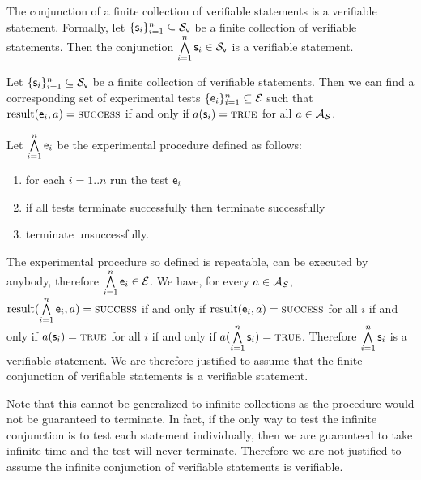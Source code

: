 \documentclass[11pt,letterpaper,fleqn]{memoir} %
\begin{document}
\begin{mathSection}
	\begin{axiom}\label{ax_verifiable_AND}
	The conjunction of a finite collection of verifiable statements is a verifiable statement. Formally, let $\{\mathsf{s}_i\}_{i=1}^{n} \subseteq \mathcal{S}_\textsf{v}$ be a finite collection of verifiable statements. Then the conjunction $\bigwedge\limits_{i=1}^{n} \mathsf{s}_i \in \mathcal{S}_\textsf{v}$ is a verifiable statement.
	\end{axiom}
	\begin{justification}
		Let $\{\mathsf{s}_i\}_{i=1}^{n} \subseteq \mathcal{S}_\textsf{v}$ be a finite collection of verifiable statements. Then we can find a corresponding set of experimental tests $\{\mathsf{e}_i\}_{i=1}^{n} \subseteq \mathcal{E}$ such that $\operatorname{result}(\mathsf{e}_i, a) = \textsc{success}$ if and only if $a(\mathsf{s}_i) = \textsc{true}$ for all $a \in \mathcal{A}_{\mathcal{S}}$.
		
		Let $\bigwedge\limits_{i=1}^{n} \mathsf{e}_i$ be the experimental procedure defined as follows:
		\begin{enumerate}
			\item for each $i=1..n$ run the test $\mathsf{e}_i$
			\item if all tests terminate successfully then terminate successfully
			\item terminate unsuccessfully.
		\end{enumerate}
		The experimental procedure so defined is repeatable, can be executed by anybody, therefore $\bigwedge\limits_{i=1}^{n} \mathsf{e}_i \in \mathcal{E}$. We have, for every $a \in \mathcal{A}_{\mathcal{S}}$, $\operatorname{result}(\bigwedge\limits_{i=1}^{n} \mathsf{e}_i, a) = \textsc{success}$ if and only if $\operatorname{result}(\mathsf{e}_i, a) = \textsc{success}$ for all $i$ if and only if $a(\mathsf{s}_i) = \textsc{true}$ for all $i$ if and only if $a(\bigwedge\limits_{i=1}^{n}\mathsf{s}_i) = \textsc{true}$. Therefore $\bigwedge\limits_{i=1}^{n}\mathsf{s}_i$ is a verifiable statement. We are therefore justified to assume that the finite conjunction of verifiable statements is a verifiable statement.
		
		Note that this cannot be generalized to infinite collections as the procedure would not be guaranteed to terminate. In fact, if the only way to test the infinite conjunction is to test each statement individually, then we are guaranteed to take infinite time and the test will never terminate. Therefore we are not justified to assume the infinite conjunction of verifiable statements is verifiable.
	\end{justification}
\end{mathSection}	
\end{document}
